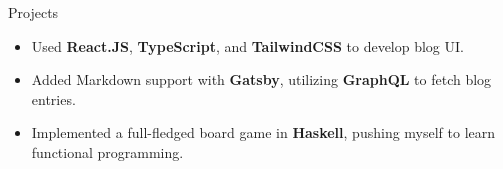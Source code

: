 \documentclass{resume} %
\begin{document}
\begin{workSection}{Projects}
	\customItem[
		title=\href{https://blog.ashkan.zone/}{blog.ashkan.zone \faExternalLink},
		duration=Solo | August 2024,
	]
	\begin{itemize}
		\vspace{-0.5em}
		\itemsep -6pt {}
		\item Used \textbf{React.JS}, \textbf{TypeScript}, and \textbf{TailwindCSS} to develop blog UI.
		\item Added Markdown support with \textbf{Gatsby}, utilizing \textbf{GraphQL} to fetch blog entries.
	\end{itemize}
	
	\customItem[
		title=\href{https://github.com/AshkanArabim/pwaang-extended}{PWAANG - a board game written in Haskell \faExternalLink},
		duration=Solo | May 2024,
	]
	\begin{itemize}
		\vspace{-0.5em}
		\itemsep -6pt {}
		\item Implemented a full-fledged board game in \textbf{Haskell}, pushing myself to learn functional programming.
	\end{itemize}
	
	

\end{workSection}
\end{document}
